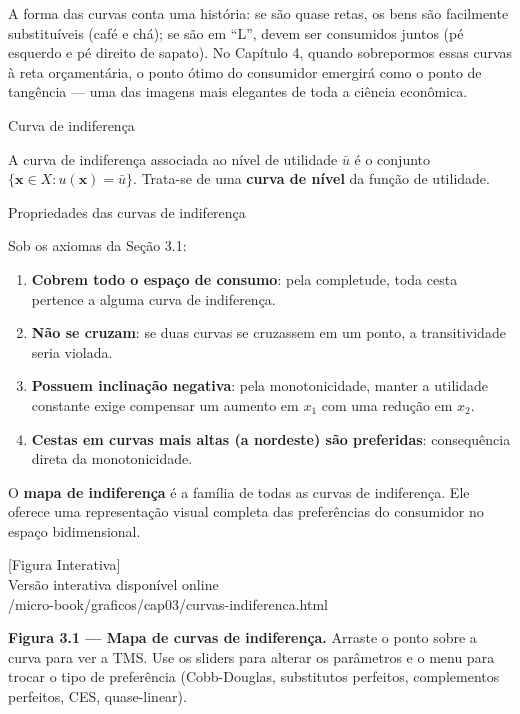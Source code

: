 \documentclass[11pt,twoside,openright]{book}
\newcommand{\figurePlaceholder}[1]{%
  \begin{center}
    \begin{tcolorbox}[
      width=0.85\textwidth,
      colback=graybg,
      colframe=gray,
      boxrule=0.5pt,
      arc=2pt,
      halign=center,
      valign=center,
      height=5cm
    ]
      \centering
      \vfill
      {\sffamily\color{gray}\large [Figura Interativa]}\\[6pt]
      {\sffamily\small\color{gray} Versão interativa disponível online}\\[4pt]
      {\ttfamily\tiny\color{gray} #1}
      \vfill
    \end{tcolorbox}
  \end{center}
}
\providecommand{\tightlist}{\setlength{\itemsep}{0pt}\setlength{\parskip}{0pt}}
\begin{document}
A forma das curvas conta uma história: se são quase retas, os bens são
facilmente substituíveis (café e chá); se são em ``L'', devem ser
consumidos juntos (pé esquerdo e pé direito de sapato). No Capítulo 4,
quando sobrepormos essas curvas à reta orçamentária, o ponto ótimo do
consumidor emergirá como o ponto de tangência --- uma das imagens mais
elegantes de toda a ciência econômica.

\begin{definitionbox}{Curva de indiferença}

A curva de indiferença associada ao nível de utilidade \(\bar{u}\) é o
conjunto \(\{\mathbf{x} \in X : u(\mathbf{x}) = \bar{u}\}\). Trata-se de
uma \textbf{curva de nível} da função de utilidade.

\end{definitionbox}

\begin{tipbox}{Propriedades das curvas de indiferença}

Sob os axiomas da Seção 3.1:

\begin{enumerate}
\def\labelenumi{\arabic{enumi}.}
\tightlist
\item
  \textbf{Cobrem todo o espaço de consumo}: pela completude, toda cesta
  pertence a alguma curva de indiferença.
\item
  \textbf{Não se cruzam}: se duas curvas se cruzassem em um ponto, a
  transitividade seria violada.
\item
  \textbf{Possuem inclinação negativa}: pela monotonicidade, manter a
  utilidade constante exige compensar um aumento em \(x_1\) com uma
  redução em \(x_2\).
\item
  \textbf{Cestas em curvas mais altas (a nordeste) são preferidas}:
  consequência direta da monotonicidade.
\end{enumerate}

O \textbf{mapa de indiferença} é a família de todas as curvas de
indiferença. Ele oferece uma representação visual completa das
preferências do consumidor no espaço bidimensional.

\end{tipbox}

\figurePlaceholder{/micro-book/graficos/cap03/curvas-indiferenca.html}

\textbf{Figura 3.1 --- Mapa de curvas de indiferença.} Arraste o ponto
sobre a curva para ver a TMS. Use os sliders para alterar os parâmetros
e o menu para trocar o tipo de preferência (Cobb-Douglas, substitutos
perfeitos, complementos perfeitos, CES, quase-linear).
\end{document}

